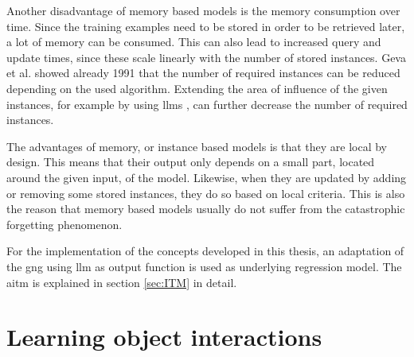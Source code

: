 Another disadvantage of memory based models is the memory consumption over time. Since the training examples need to be stored in order to be retrieved later, a lot of memory can be consumed. This can also lead to increased query and update times, since these scale linearly with the number of stored instances. Geva et al. \cite{protReduction} showed already 1991 that the number of required instances can be reduced depending on the used algorithm. Extending the area of influence of the given instances, for example by using \glspl{llm} \cite{LLM}, can further decrease the number of required instances.

The advantages of memory, or instance based models is that they are local by design. This means that their output only depends on a small part, located around the given input, of the model. Likewise, when they are updated by adding or removing some stored instances, they do so based on local criteria. This is also the reason that memory based models usually do not suffer from the catastrophic forgetting phenomenon.

For the implementation of the concepts developed in this thesis, an adaptation of the \gls{gng} using \gls{llm} as output function is used as underlying regression model. The \gls{aitm} is explained in section \ref{sec:ITM} in detail.

%
%
%

\section{Learning object interactions}

